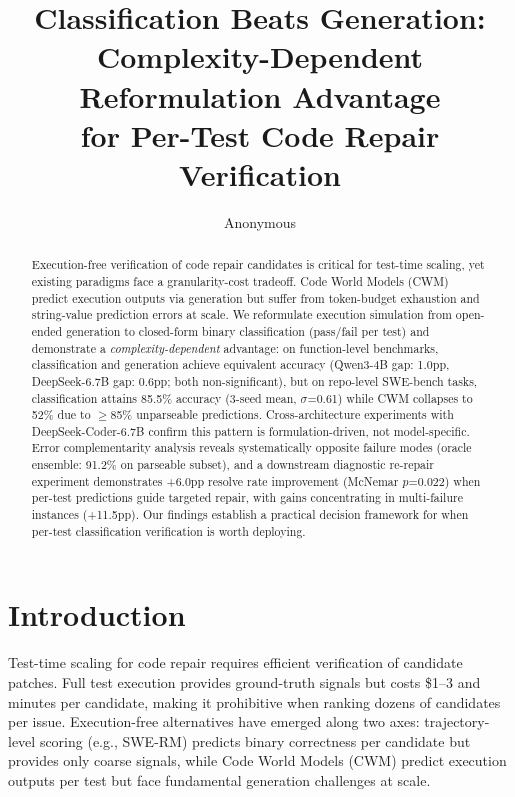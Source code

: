 \documentclass[11pt]{article}
\title{Classification Beats Generation: Complexity-Dependent Reformulation Advantage\\for Per-Test Code Repair Verification}
\author{Anonymous}
\date{}
\begin{document}
\maketitle

\begin{abstract}
Execution-free verification of code repair candidates is critical for test-time scaling, yet existing paradigms face a granularity-cost tradeoff. Code World Models (CWM) predict execution outputs via generation but suffer from token-budget exhaustion and string-value prediction errors at scale. We reformulate execution simulation from open-ended generation to closed-form binary classification (pass/fail per test) and demonstrate a \emph{complexity-dependent} advantage: on function-level benchmarks, classification and generation achieve equivalent accuracy (Qwen3-4B gap: 1.0pp, DeepSeek-6.7B gap: 0.6pp; both non-significant), but on repo-level SWE-bench tasks, classification attains 85.5\% accuracy (3-seed mean, $\sigma$=0.61) while CWM collapses to 52\% due to $\geq$85\% unparseable predictions. Cross-architecture experiments with DeepSeek-Coder-6.7B confirm this pattern is formulation-driven, not model-specific. Error complementarity analysis reveals systematically opposite failure modes (oracle ensemble: 91.2\% on parseable subset), and a downstream diagnostic re-repair experiment demonstrates +6.0pp resolve rate improvement (McNemar $p$=0.022) when per-test predictions guide targeted repair, with gains concentrating in multi-failure instances (+11.5pp). Our findings establish a practical decision framework for when per-test classification verification is worth deploying.
\end{abstract}

\section{Introduction}

Test-time scaling for code repair requires efficient verification of candidate patches. Full test execution provides ground-truth signals but costs \$1--3 and minutes per candidate, making it prohibitive when ranking dozens of candidates per issue. Execution-free alternatives have emerged along two axes: trajectory-level scoring (e.g., SWE-RM) predicts binary correctness per candidate but provides only coarse signals, while Code World Models (CWM) predict execution outputs per test but face fundamental generation challenges at scale.
\end{document}
